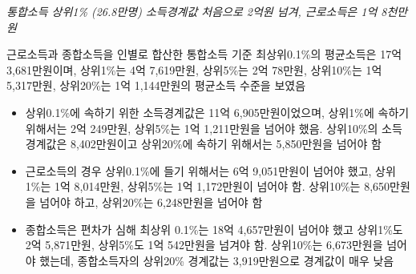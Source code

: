 \documentclass[
  a4paper,
  oneside,
  open=any]{scrbook}
\begin{document}
\emph{통합소득 상위1\% (26.8만명) 소득경계값 처음으로 2억원 넘겨,
근로소득은 1억 8천만원}

근로소득과 종합소득을 인별로 합산한 통합소득 기준 최상위0.1\%의
평균소득은 17억 3,681만원이며, 상위1\%는 4억 7,619만원, 상위5\%는 2억
78만원, 상위10\%는 1억 5,317만원, 상위20\%는 1억 1,144만원의 평균소득
수준을 보였음

\begin{itemize}
\item
  상위0.1\%에 속하기 위한 소득경계값은 11억 6,905만원이었으며, 상위1\%에
  속하기 위해서는 2억 249만원, 상위5\%는 1억 1,211만원을 넘어야 했음.
  상위10\%의 소득경계값은 8,402만원이고 상위20\%에 속하기 위해서는
  5,850만원을 넘어야 함
\item
  근로소득의 경우 상위0.1\%에 들기 위해서는 6억 9,051만원이 넘어야 했고,
  상위 1\%는 1억 8,014만원, 상위5\%는 1억 1,172만원이 넘어야 함.
  상위10\%는 8,650만원을 넘어야 하고, 상위20\%는 6,248만원을 넘어야 함
\item
  종합소득은 편차가 심해 최상위 0.1\%는 18억 4,657만원이 넘어야 했고
  상위1\%도 2억 5,871만원, 상위5\%도 1억 542만원을 넘겨야 함. 상위10\%는
  6,673만원을 넘어야 했는데, 종합소득자의 상위20\% 경계값는
  3,919만원으로 경계값이 매우 낮음
\end{itemize}
\end{document}
